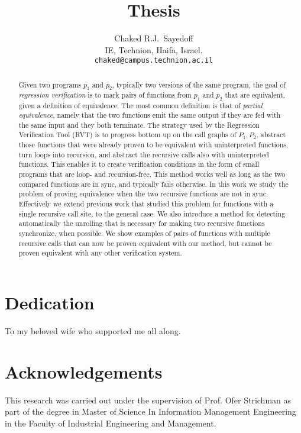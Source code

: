 \documentclass[12pt]{report}
\title{Thesis}
\author{
  Chaked R.J.~Sayedoff \\
  IE, Technion, Haifa, Israel.\\
    \texttt{chaked@campus.technion.ac.il}\\
}
\begin{document}
\maketitle



\begin{abstract}
Given two programs $p_1$ and $p_2$, typically two versions of the same program, the goal of \emph{regression verification} is to mark pairs of functions from $p_1$ and $p_2$ that are equivalent, given a definition of equivalence. The most common definition is that of \emph{partial equivalence}, namely that the two functions emit the same output if they are fed with the same input and they both terminate. 
The strategy used by the Regression Verification Tool (RVT) is to progress bottom up on the call graphs of $P_1,P_2$, abstract those functions that were already proven to be equivalent with uninterpreted functions, turn loops into recursion, and abstract the recursive calls also with uninterpreted functions. This enables it to create verification conditions in the form of small programs that are loop- and recursion-free. This method works well as long as the two compared functions are in sync, and typically fails otherwise. In this work we study the problem of proving equivalence when the two recursive functions are not in sync. Effectively we extend  previous work that studied this problem for functions with a single recursive call site, to the general case. We also introduce a method for detecting automatically the unrolling that is necessary for making two recursive functions synchronize, when possible. We show examples of pairs of functions with multiple recursive calls that can now be proven equivalent with our method, but cannot be proven equivalent with any other verification system.
\end{abstract}

\chapter*{Dedication}
To my beloved wife who supported me all along.


\chapter*{Acknowledgements}
This research was carried out under the supervision of Prof. Ofer Strichman as
part of the degree in Master of Science In Information Management Engineering
in the Faculty of Industrial Engineering and Management.
\vspace*{\fill}
\end{document}
